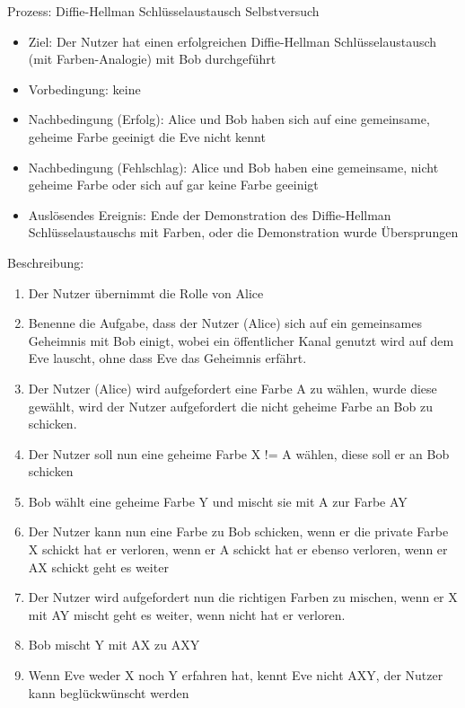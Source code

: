 \documentclass{article}
\begin{document}
\begin{FA}[start=100]
\item Prozess: Diffie-Hellman Schlüsselaustausch Selbstversuch
\end{FA}
\begin{itemize}[label={}]
    \item Ziel: Der Nutzer hat einen erfolgreichen Diffie-Hellman Schlüsselaustausch
        (mit Farben-Analogie) mit Bob durchgeführt
    \item Vorbedingung: keine
    \item Nachbedingung (Erfolg): Alice und Bob haben sich auf eine
        gemeinsame, geheime Farbe geeinigt die Eve nicht kennt
    \item Nachbedingung (Fehlschlag): Alice und Bob haben eine gemeinsame,
        nicht geheime Farbe oder sich auf gar keine Farbe geeinigt
    \item Auslösendes Ereignis: Ende der Demonstration des Diffie-Hellman
        Schlüsselaustauschs mit Farben, oder die Demonstration wurde Übersprungen
\end{itemize}

Beschreibung:
\begin{enumerate}
    \item Der Nutzer übernimmt die Rolle von Alice
    \item Benenne die Aufgabe, dass der Nutzer (Alice) sich auf ein gemeinsames Geheimnis
        mit Bob einigt, wobei ein öffentlicher Kanal genutzt wird auf dem Eve lauscht,
        ohne dass Eve das Geheimnis erfährt.
    \item Der Nutzer (Alice) wird aufgefordert eine Farbe A zu wählen,
        wurde diese gewählt, wird der Nutzer aufgefordert
        die nicht geheime Farbe an Bob zu schicken.
    \item Der Nutzer soll nun eine geheime Farbe X != A wählen,
        diese soll er an Bob schicken
    \item Bob wählt eine geheime Farbe Y und mischt sie mit A zur Farbe AY
    \item Der Nutzer kann nun eine Farbe zu Bob schicken,
        wenn er die private Farbe X schickt hat er verloren,
        wenn er A schickt hat er ebenso verloren,
        wenn er AX schickt geht es weiter
    \item Der Nutzer wird aufgefordert nun die richtigen Farben zu mischen,
        wenn er X mit AY mischt geht es weiter, wenn nicht hat er verloren.
    \item Bob mischt Y mit AX zu AXY
    \item Wenn Eve weder X noch Y erfahren hat, kennt Eve nicht AXY,
        der Nutzer kann beglückwünscht werden
\end{enumerate}
\end{document}
